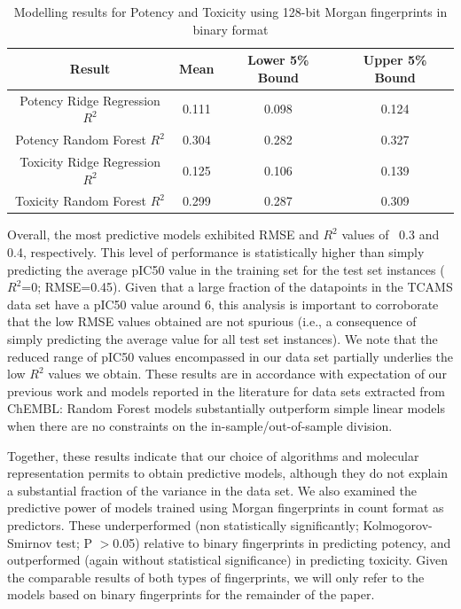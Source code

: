 \documentclass[journal=jacsat,manuscript=article]{achemso}
\begin{document}
\begin{table}[h!]
\centering
 \begin{tabular}{||c c c c||} 
 \hline
 Result & Mean & Lower 5\% Bound & Upper 5\% Bound \\ [0.5ex] 
 \hline\hline
Potency Ridge Regression $R^2$ & 0.111 & 0.098 & 0.124 \\ 
 \hline
Potency Random Forest $R^2$ & 0.304 & 0.282 & 0.327 \\
 \hline
Toxicity Ridge Regression $R^2$ & 0.125 & 0.106 & 0.139 \\
 \hline
Toxicity Random Forest $R^2$ & 0.299 & 0.287 & 0.309\\
 \hline
\end{tabular}
\caption{Modelling results for Potency and Toxicity using 128-bit Morgan fingerprints in binary format}
\label{table:Potency}
\end{table}


Overall, the most predictive models exhibited RMSE and $R^2$ values of ~0.3 and 0.4, respectively. 
This level of performance is statistically higher than simply predicting the average pIC50 value in the training set for the test set instances ($R^2$=0; RMSE=0.45). Given that a large fraction of the datapoints in the TCAMS data set have a pIC50 value around 6, this analysis is important to corroborate that the low RMSE values obtained are not spurious (i.e., a consequence of simply predicting the average value for all test  set instances). We note that the reduced range of pIC50 values encompassed in our data set partially underlies the low $R^2$ values we obtain\cite{Alexander2015}.
These results are in accordance with expectation of our previous work\citep{et1:} and models reported in the literature for data sets extracted from ChEMBL: Random Forest models substantially outperform simple linear models when there are no constraints on the in-sample/out-of-sample division.

Together, these results indicate that our choice of algorithms and molecular representation permits to obtain predictive models, although they do not explain a substantial fraction of the variance in the data set.  
\newline
\newline
We also examined the predictive power of models trained using  Morgan fingerprints in count format as predictors. These underperformed (non statistically significantly; Kolmogorov-Smirnov test; P $>$0.05) relative to binary fingerprints in predicting potency, and outperformed (again without statistical significance) in predicting toxicity.  
Given the comparable results of both types of fingerprints, we will only refer to the models based on binary fingerprints for the remainder of the paper.
\end{document}
